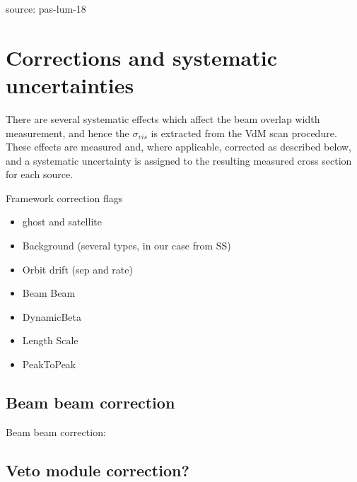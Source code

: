 source: pas-lum-18

\section{Corrections and systematic uncertainties}
There are several systematic effects which affect the beam overlap width measurement, and hence the $\sigma_{vis}$ is extracted from the VdM scan procedure. These effects are measured and, where applicable, corrected as described below, and a systematic uncertainty is assigned to the resulting measured cross section for each source.

Framework correction flags

\begin{itemize}
 \item ghost and satellite
 \item Background (several types, in our case from SS)
 \item Orbit drift (sep and rate)
 \item Beam Beam
 \item DynamicBeta
 \item Length Scale
 \item PeakToPeak
\end{itemize}



\subsection{Beam beam correction}
Beam beam correction:


\subsection{Veto module correction?}



